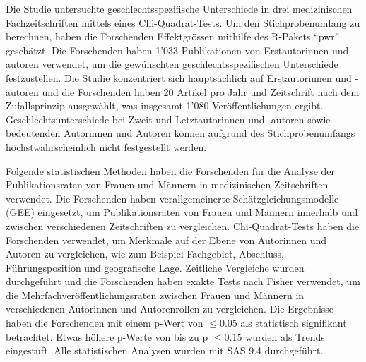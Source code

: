 Die Studie untersuchte geschlechtsspezifische Unterschiede in drei medizinischen Fachzeitschriften mittels eines Chi-Quadrat-Tests. 
Um den Stichprobenumfang zu berechnen, haben die Forschenden Effektgrössen mithilfe des R-Pakets \enquote{pwr} geschätzt. 
Die Forschenden haben 1'033 Publikationen von Erstautorinnen und -autoren verwendet, um die gewünschten geschlechtsspezifischen Unterschiede festzustellen. 
Die Studie konzentriert sich hauptsächlich auf Erstautorinnen und -autoren und die Forschenden haben 20 Artikel pro Jahr und Zeitschrift nach dem 
Zufallsprinzip ausgewählt, was insgesamt 1'080 Veröffentlichungen ergibt. 
Geschlechtsunterschiede bei Zweit-und Letztautorinnen und -autoren sowie bedeutenden Autorinnen und Autoren können aufgrund des Stichprobenumfangs höchstwahrscheinlich 
nicht festgestellt werden.

Folgende statistischen Methoden haben die Forschenden für die Analyse der Publikationsraten von Frauen und Männern 
in medizinischen Zeitschriften verwendet. 
Die Forschenden haben verallgemeinerte Schätzgleichungsmodelle (GEE) eingesetzt, um Publikationsraten von Frauen 
und Männern innerhalb und zwischen verschiedenen Zeitschriften zu vergleichen. 
Chi-Quadrat-Tests haben die Forschenden verwendet, um Merkmale auf der Ebene von Autorinnen und Autoren zu vergleichen, wie zum Beispiel Fachgebiet, Abschluss, 
Führungsposition und geografische Lage. 
Zeitliche Vergleiche wurden durchgeführt und die Forschenden haben exakte Tests nach Fisher verwendet, um die Mehrfachveröffentlichungsraten 
zwischen Frauen und Männern in verschiedenen Autorinnen und Autorenrollen zu vergleichen. 
Die Ergebnisse haben die Forschenden mit einem p-Wert von $\leq 0.05$ als statistisch signifikant betrachtet. Etwas höhere 
p-Werte von bis zu p $\leq 0.15$ wurden als Trends eingestuft. 
Alle statistischen Analysen wurden mit SAS 9.4 durchgeführt.



